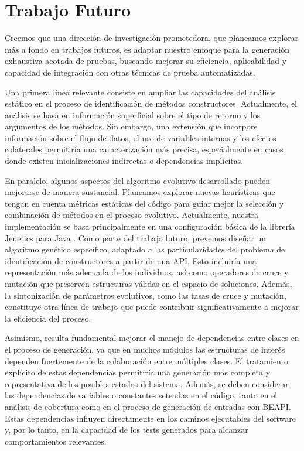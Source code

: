 \chapter{Trabajo Futuro}
\label{cap:future}

Creemos que una dirección de investigación prometedora, que planeamos explorar más a fondo en trabajos futuros, 
es adaptar nuestro enfoque para la generación exhaustiva acotada de pruebas, buscando mejorar su eficiencia, aplicabilidad y capacidad de integración con otras técnicas de prueba automatizadas.

Una primera línea relevante consiste en ampliar las capacidades del análisis estático en el proceso de identificación de métodos constructores. 
Actualmente, el análisis se basa en información superficial sobre el tipo de retorno y los argumentos de los métodos. 
Sin embargo, una extensión que incorpore información sobre el flujo de datos, el uso de variables internas y los efectos colaterales permitiría una caracterización más precisa, 
especialmente en casos donde existen inicializaciones indirectas o dependencias implícitas.

En paralelo, algunos aspectos del algoritmo evolutivo desarrollado pueden mejorarse de manera sustancial. 
Planeamos explorar nuevas heurísticas que tengan en cuenta métricas estáticas del código para guiar mejor la selección y combinación de métodos en el proceso evolutivo. 
Actualmente, nuestra implementación se basa principalmente en una configuración básica de la librería Jenetics para Java \cite{jenetics}. 
Como parte del trabajo futuro, prevemos diseñar un algoritmo genético específico, adaptado a las particularidades del problema de identificación de constructores a partir de una API. 
Esto incluiría una representación más adecuada de los individuos, así como operadores de cruce y mutación que preserven estructuras válidas en el espacio de soluciones. 
Además, la sintonización de parámetros evolutivos, como las tasas de cruce y mutación, constituye otra línea de trabajo que puede contribuir significativamente a mejorar la eficiencia del proceso.

Asimismo, resulta fundamental mejorar el manejo de dependencias entre clases en el proceso de generación, 
ya que en muchos módulos las estructuras de interés dependen fuertemente de la colaboración entre múltiples clases. 
El tratamiento explícito de estas dependencias permitiría una generación más completa y representativa de los posibles estados del sistema. 
Además, se deben considerar las dependencias de variables o constantes seteadas en el código, tanto en el análisis de cobertura como en el proceso de generación de entradas con BEAPI. 
Estas dependencias influyen directamente en los caminos ejecutables del software y, por lo tanto, en la capacidad de los tests generados para alcanzar comportamientos relevantes.

